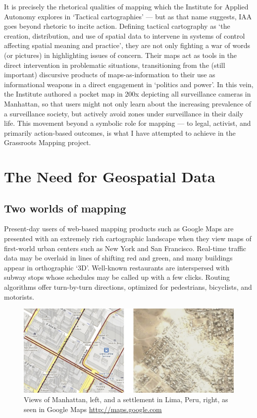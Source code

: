 \documentclass[11pt,oneside,notitlepage]{report}
\begin{document}
It is precisely the rhetorical qualities of mapping which the Institute for Applied Autonomy explores in `Tactical cartographies' --- but as that name suggests, IAA goes beyond rhetoric to incite action. Defining tactical cartography as `the creation, distribution, and use of spatial data to intervene in systems of control affecting spatial meaning and practice', they are not only fighting a war of words (or pictures) in highlighting issues of concern. Their maps act as tools in the direct intervention in problematic situations, transitioning from the (still important) discursive products of maps-as-information to their use as informational weapons in a direct engagement in `politics and power'. \cite{institute2008tactical} In this vein, the Institute authored a pocket map in 200x depicting all surveillance cameras in Manhattan, so that users might not only learn about the increasing prevalence of a surveillance society, but actively avoid zones under surveillance in their daily life. This movement beyond a symbolic role for mapping --- to legal, activist, and primarily action-based outcomes, is what I have attempted to achieve in the Grassroots Mapping project.

\chapter{The Need for Geospatial Data}
\label{chap:need}

\section{Two worlds of mapping}
\label{sec:twoworlds}

Present-day users of web-based mapping products such as Google Maps are presented with an extremely rich cartographic landscape when they view maps of first-world urban centers such as New York and San Francisco. Real-time traffic data may be overlaid in lines of shifting red and green, and many buildings appear in orthographic `3D'. Well-known restaurants are interspersed with subway stops whose schedules may be called up with a few clicks. Routing algorithms offer turn-by-turn directions, optimized for pedestrians, bicyclists, and motorists. 

\begin{figure}[h]
	\begin{center}
		\includegraphics[width=1\textwidth]{images/two-worlds-mapping.png}
		\caption{Views of Manhattan, left, and a settlement in Lima, Peru, right, as seen in Google Maps \url{http://maps.google.com}}
	\end{center}
\end{figure}
\end{document}
